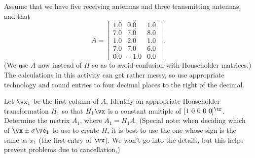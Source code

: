 \begin{pactivity} \label{act:MIMO_Householder} Assume that we have five receiving antennas and three transmitting antennas, and that 
\[A = \left[ \begin{array}{crc} 1.0&0.0&1.0 \\ 7.0&7.0&8.0 \\1.0&2.0&1.0 \\ 7.0&7.0&6.0 \\ 0.0&-1.0&0.0 \end{array} \right].\]
(We use $A$ now instead of $H$ so as to avoid confusion with Householder matrices.) The calculations in this activity can get rather messy, so use appropriate technology and round entries to four decimal places to the right of the decimal. 
\ba
\item Let $\vx_1$ be the first column of $A$. Identify an appropriate Householder transformation $H_1$ so that $H_1 \vx$ is a constant multiple of $[1 \ 0 \ 0 \ 0 \ 0]^{\tr}$. Determine the matrix $A_1$, where $A_1 = H_1 A$. (Special note: when deciding which of $\vx \pm \sigma \ve_1$ to use to create $H$, it is best to use the one whose sign is the same as $x_1$ (the first entry of $\vx$). We won't go into the details, but this helps prevent problems due to cancellation,)

\begin{comment}

\solution Let $\vx_1 = \left[ \begin{array}{c} 1.0\\7.0\\1.0\\7.0\\0.0 \end{array} \right]$. Let $\sigma_1 = ||\vx_1|| =  10.0$, and let 
\[\vv_1 = \vx_1 + \sigma_1 \ve_1 = \left[ \begin{array}{c}  11.0\\7.0\\1.0\\7.0\\0.0 \end{array} \right].\]
From this we have the Householder matrix 
\[H_1 = I_5 - 2\frac{\vv_1 \vv_1^{\tr}}{||\vv_1||^2}.\]
Then
\[A_1 = H_1A = \left[ \begin{array}{rrr} 
-10.0000&-10.0000&-10.0000\\ 
0.0000&-0.6364&1.0000 \\ 
0.0000&-1.0909&0.0000\\ 
0.0000&-0.6364&-1.0000\\ 
0.0000&-1.0000&0.0000
\end{array} \right].\]


\end{comment}
\end{pactivity}

